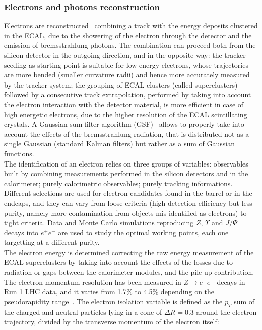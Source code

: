 \subsubsection{Electrons and photons reconstruction}
Electrons are reconstructed~\cite{Chatrchyan:2013dga} combining a track with the energy deposits clustered in the ECAL, due to the showering of the electron through the detector and the emission of bremsstrahlung photons. The combination can proceed both from the silicon detector in the outgoing direction, and in the opposite way: the tracker seeding as starting point is suitable for low energy electrons, whose trajectories are more bended (smaller curvature radii) and hence more accurately measured by the tracker system; the grouping of ECAL clusters (called superclusters) followed by a consecutive track extrapolation, performed by taking into account the electron interaction with the detector material, is more efficient in case of high energetic electrons, due to the higher resolution of the ECAL scintillating crystals. A Gaussian-sum filter algorithm (GSF)~\cite{Adam:2005bya} allows to properly take into account the effects of the bremsstrahlung radiation, that is distributed not as a single Gaussian (standard Kalman filters) but rather as a sum of Gaussian functions.\\
The identification of an electron relies on three groups of variables: observables built by combining measurements performed in the silicon detectors and in the calorimeter; purely calorimetric observables; purely tracking informations. Different selections are used for electron candidates found in the barrel or in the endcaps, and they can vary from loose criteria (high detection efficiency but less purity, namely more contamination from objects mis-identified as electrons) to tight criteria. Data and Monte Carlo simulations reproducing $Z$, $\Upsilon$ and $J/\Psi$ decays into $e^+ e^-$ are used to study the optimal working points, each one targetting at a different purity.\\
The electron energy is determined correcting the raw energy measurement of the ECAL superclusters by taking into account the effects of the losses due to radiation or gaps between the calorimeter modules, and the pile-up contribution. The electron momentum resolution has been measured in $Z \rightarrow e^+ e^-$ decays in Run 1 LHC data, and it varies from 1.7\% to 4.5\% depending on the pseudorapidity range~\cite{Khachatryan:2015hwa}. %
The electron isolation variable is defined as the $p_T$ sum of the charged and neutral particles lying in a cone of $\Delta R = 0.3$ around the electron trajectory, divided by the transverse momentum of the electron itself:

